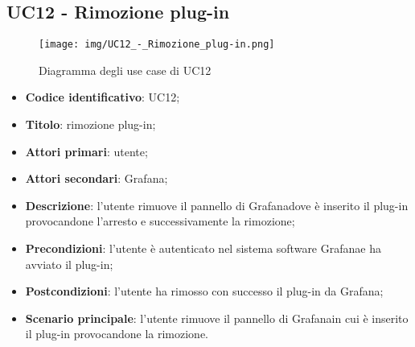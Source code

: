 \subsection{UC12 - Rimozione plug-in}
\begin{figure}[H]
\texttt{[image: img/UC12\_-\_Rimozione\_plug-in.png]}
\caption{Diagramma degli use case di UC12}
\end{figure}
\begin{itemize}
    \item \textbf{Codice identificativo}: UC12;
    \item \textbf{Titolo}: rimozione plug-in;
    \item \textbf{Attori primari}: utente;
    \item \textbf{Attori secondari}: Grafana\glo;
    \item \textbf{Descrizione}: l'utente rimuove il pannello di Grafana\glosp dove è inserito il plug-in provocandone l'arresto e successivamente la rimozione;
    \item \textbf{Precondizioni}: l'utente è autenticato nel sistema software Grafana\glosp e ha avviato il plug-in;
    \item \textbf{Postcondizioni}: l'utente ha rimosso con successo il plug-in da Grafana\glo;
    \item \textbf{Scenario principale}: l'utente rimuove il pannello di Grafana\glosp in cui è inserito il plug-in provocandone la rimozione.
\end{itemize}
